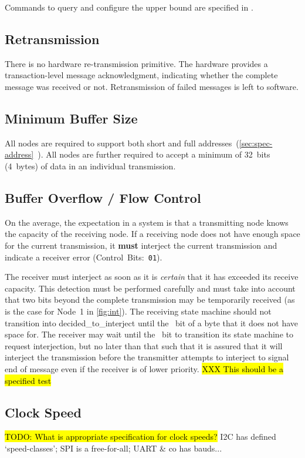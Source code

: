 Commands to query and configure the upper bound are specified in
.

\subsection{Retransmission}
There is no hardware re-transmission primitive. The hardware provides a
transaction-level message acknowledgment, indicating whether the complete
message was received or not. Retransmission of failed messages is left to
software.

\subsection{Minimum Buffer Size}
All \bus nodes are required to support both short and full
addresses~(\ref{sec:spec-address}~). All \bus nodes
are further required to accept a minimum of 32~bits (4~bytes) of data in an
individual transmission.

\subsection{Buffer Overflow / Flow Control}
On the average, the expectation in a \bus system is that a transmitting node
knows the capacity of the receiving node. If a receiving node does not have
enough space for the current transmission, it {\bf must} interject the current
transmission and indicate a receiver error (Control~Bits:~{\tt 01}).

The receiver must interject as soon as it is {\em certain} that it has
exceeded its receive capacity. This detection must be performed carefully and
must take into account that two bits beyond the complete transmission may be
temporarily received (as is the case for Node~1 in \cref{fig:int}). The
receiving state machine should not transition into {\sc
decided\_to\_interject} until the ~bit of a byte that it does not have
space for. The receiver may wait until the ~bit to transition its state
machine to request interjection, but no later than that such that it is
assured that it will interject the transmission before the transmitter
attempts to interject to signal end of message even if the receiver is of
lower priority.
\hl{XXX This should be a specified test}

\subsection{Clock Speed}
\hl{TODO: What is appropriate specification for clock speeds?} I2C has defined
`speed-classes'; SPI is a free-for-all; UART \& co has bauds...

